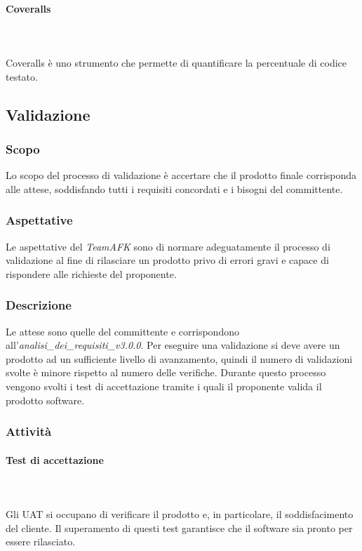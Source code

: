 \paragraph{Coveralls} \mbox{} \\ \mbox{} \\
Coveralls è uno strumento che permette di quantificare la percentuale di codice testato.

\subsection{Validazione}
\subsubsection{Scopo}
Lo scopo del processo di validazione è  accertare che il prodotto finale corrisponda alle attese, soddisfando tutti i requisiti concordati e i bisogni del committente.

\subsubsection{Aspettative}
Le aspettative del \textit{TeamAFK} sono di normare adeguatamente il processo di validazione al fine di rilasciare un prodotto privo di errori gravi e capace di rispondere alle richieste del proponente.

\subsubsection{Descrizione}
Le attese sono quelle del committente e corrispondono all’\textit{analisi\_dei\_requisiti\_v3.0.0}. Per eseguire una validazione si deve avere un prodotto ad un sufficiente livello di avanzamento, quindi il numero di validazioni svolte è minore rispetto al numero delle verifiche. Durante questo processo vengono svolti i test di accettazione tramite i quali il proponente valida il prodotto software.

\subsubsection{Attività}
\paragraph{Test di accettazione}\mbox{} \\ \mbox{} \\
Gli UAT si occupano di verificare il prodotto e, in particolare, il soddisfacimento del cliente. Il superamento di questi test garantisce che il software sia pronto per essere rilasciato.

